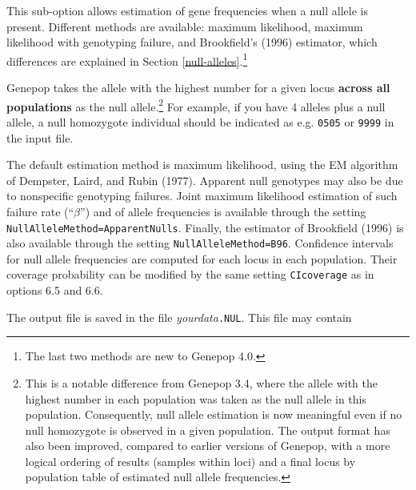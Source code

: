 \documentclass[12pt,]{book}
\let\rmarkdownfootnote\footnote%
\def\footnote{\protect\rmarkdownfootnote}
\theoremstyle{definition}
\theoremstyle{definition}
\theoremstyle{definition}
\theoremstyle{remark}
\begin{document}
 This sub-option allows estimation of gene
frequencies when a null allele is present. Different methods are
available: maximum likelihood, maximum likelihood with genotyping
failure, and Brookfield's (1996) estimator, which differences are
explained in Section \ref{null-alleles}.\footnote{The last two methods
  are new to Genepop 4.0.}

Genepop takes the allele with the highest number for a given locus
\textbf{across all populations} as the null allele.\footnote{This is a
  notable difference from Genepop 3.4, where the allele with the highest
  number in each population was taken as the null allele in this
  population. Consequently, null allele estimation is now meaningful
  even if no null homozygote is observed in a given population. The
  output format has also been improved, compared to earlier versions of
  Genepop, with a more logical ordering of results (samples within loci)
  and a final locus by population table of estimated null allele
  frequencies.} For example, if you have 4 alleles plus a null allele, a
null homozygote individual should be indicated as e.g. \texttt{0505} or
\texttt{9999} in the input file.

The default estimation method is maximum likelihood, using the EM
algorithm of Dempster, Laird, and Rubin (1977). Apparent null genotypes
may also be due to nonspecific genotyping failures. Joint maximum
likelihood estimation of such failure rate (``\(\beta\)'') and of allele
frequencies is available through the setting
\texttt{NullAlleleMethod=ApparentNulls}. Finally, the estimator of
Brookfield (1996) is also available through the setting
\texttt{NullAlleleMethod=B96}. Confidence intervals for null allele frequencies are computed
for each locus in each population. Their coverage probability can be
modified by the same setting \texttt{CIcoverage} as in options 6.5 and
6.6.

The output file is saved in the file \emph{yourdata}\texttt{.NUL}. This
file may contain
\end{document}
